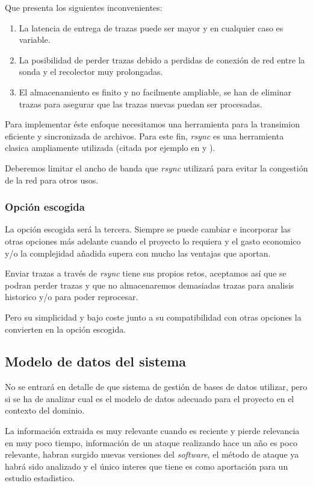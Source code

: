 Que presenta los siguientes inconvenientes:

\begin{enumerate}
    \item La latencia de entrega de trazas puede ser mayor y en cualquier caso es variable.
    \item La posibilidad de perder trazas debido a perdidas de conexión de red entre la sonda y el recolector muy prolongadas.
    \item El almacenamiento es finito y no facilmente ampliable, se han de eliminar trazas para asegurar que las trazas nuevas puedan
    ser procesadas.
\end{enumerate}

Para implementar éste enfoque necesitamos una herramienta para la transimion eficiente y sincronizada de archivos. Para este fin,
\emph{rsync} es una herramienta clasica ampliamente utilizada (citada por ejemplo en \cite{Ph.D.200301} y \cite{douglis2004web}).

Deberemos limitar el ancho de banda que \emph{rsync} utilizará para evitar la congestión de la red para otros usos.

\subsubsection{Opción escogida}

La opción escogida será la tercera. Siempre se puede cambiar e incorporar las otras opciones más adelante cuando el proyecto lo requiera y el gasto economico
y/o la complejidad añadida supera con mucho las ventajas que aportan.

Enviar trazas a través de \emph{rsync} tiene sus propios retos, aceptamos así que se podran perder trazas y que no almacenaremos
demasiadas trazas para analisis historico y/o para poder reprocesar.

Pero su simplicidad y bajo coste junto a su compatibilidad con otras opciones la convierten en la opción escogida.

\subsection{Modelo de datos del sistema}
\label{subsec:modelo-de-datos}
No se entrará en detalle de que sistema de gestión de bases de datos utilizar, pero si  se ha de analizar cual es el modelo de datos
adecuado para el proyecto en el contexto del dominio.

La información extraida es muy relevante cuando es reciente y pierde relevancia en muy poco tiempo, información de un ataque realizando
hace un año es poco relevante, habran surgido nuevas versiones del \emph{software}, el método de ataque ya habrá sido analizado y el único interes
que tiene es como aportación para un estudio estadistico.

